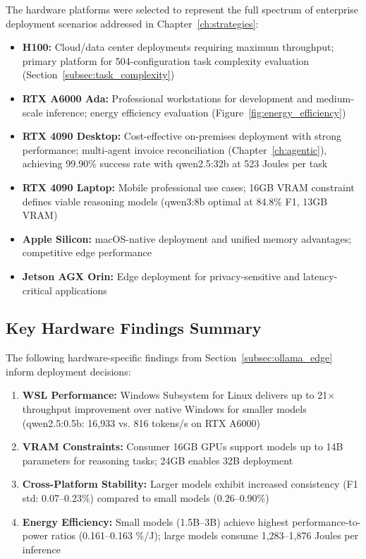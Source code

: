 The hardware platforms were selected to represent the full spectrum of enterprise deployment scenarios addressed in Chapter~\ref{ch:strategies}:

\begin{itemize}[leftmargin=*]
    \item \textbf{H100:} Cloud/data center deployments requiring maximum throughput; primary platform for 504-configuration task complexity evaluation (Section~\ref{subsec:task_complexity})
    \item \textbf{RTX A6000 Ada:} Professional workstations for development and medium-scale inference; energy efficiency evaluation (Figure~\ref{fig:energy_efficiency})
    \item \textbf{RTX 4090 Desktop:} Cost-effective on-premises deployment with strong performance; multi-agent invoice reconciliation (Chapter~\ref{ch:agentic}), achieving 99.90\% success rate with qwen2.5:32b at 523 Joules per task
    \item \textbf{RTX 4090 Laptop:} Mobile professional use cases; 16GB VRAM constraint defines viable reasoning models (qwen3:8b optimal at 84.8\% F1, 13GB VRAM)
    \item \textbf{Apple Silicon:} macOS-native deployment and unified memory advantages; competitive edge performance
    \item \textbf{Jetson AGX Orin:} Edge deployment for privacy-sensitive and latency-critical applications
\end{itemize}

\subsection{Key Hardware Findings Summary}

The following hardware-specific findings from Section~\ref{subsec:ollama_edge} inform deployment decisions:

\begin{enumerate}[leftmargin=*]
    \item \textbf{WSL Performance:} Windows Subsystem for Linux delivers up to 21$\times$ throughput improvement over native Windows for smaller models (qwen2.5:0.5b: 16,933 vs. 816 tokens/s on RTX A6000)
    \item \textbf{VRAM Constraints:} Consumer 16GB GPUs support models up to 14B parameters for reasoning tasks; 24GB enables 32B deployment
    \item \textbf{Cross-Platform Stability:} Larger models exhibit increased consistency (F1 std: 0.07--0.23\%) compared to small models (0.26--0.90\%)
    \item \textbf{Energy Efficiency:} Small models (1.5B--3B) achieve highest performance-to-power ratios (0.161--0.163 \%/J); large models consume 1,283--1,876 Joules per inference
\end{enumerate}

